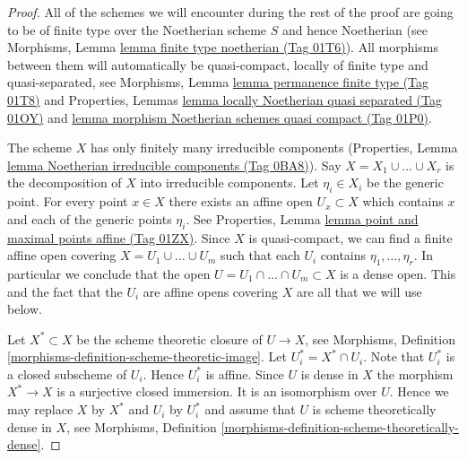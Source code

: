\documentclass{amsart}
\theoremstyle{plain}
\theoremstyle{definition}
\theoremstyle{remark}
\numberwithin{equation}{subsection}
\begin{document}
\begin{proof}
All of the schemes we will encounter during the rest of the proof
are going to be of finite type over the Noetherian scheme $S$ and
hence Noetherian
(see Morphisms, Lemma \href{https://stacks.math.columbia.edu/tag/01T6}{lemma finite type noetherian (Tag 01T6)}).
All morphisms between them will automatically be quasi-compact, locally of
finite type and quasi-separated, see
Morphisms, Lemma \href{https://stacks.math.columbia.edu/tag/01T8}{lemma permanence finite type (Tag 01T8)} and
Properties,
Lemmas \href{https://stacks.math.columbia.edu/tag/01OY}{lemma locally Noetherian quasi separated (Tag 01OY)} and
\href{https://stacks.math.columbia.edu/tag/01P0}{lemma morphism Noetherian schemes quasi compact (Tag 01P0)}.

\medskip\noindent
The scheme $X$ has only finitely many irreducible components
(Properties, Lemma \href{https://stacks.math.columbia.edu/tag/0BA8}{lemma Noetherian irreducible components (Tag 0BA8)}).
Say $X = X_1 \cup \ldots \cup X_r$ is the decomposition
of $X$ into irreducible components.
Let $\eta_i \in X_i$ be the generic point.
For every point $x \in X$ there exists an affine open
$U_x \subset X$ which contains $x$ and each of the generic
points $\eta_i$. See
Properties, Lemma \href{https://stacks.math.columbia.edu/tag/01ZX}{lemma point and maximal points affine (Tag 01ZX)}.
Since $X$ is quasi-compact, we can find a finite affine open
covering $X = U_1 \cup \ldots \cup U_m$ such that
each $U_i$ contains $\eta_1, \ldots, \eta_r$.
In particular we conclude that the open
$U = U_1 \cap \ldots \cap U_m \subset X$ is
a dense open. This and the fact that the $U_i$ are affine opens
covering $X$ are all that we will use below.

\medskip\noindent
Let $X^* \subset X$ be the scheme theoretic closure of $U \to X$, see
Morphisms, Definition \ref{morphisms-definition-scheme-theoretic-image}.
Let $U_i^* = X^* \cap U_i$. Note that $U_i^*$ is a closed subscheme
of $U_i$. Hence $U_i^*$ is affine. Since $U$ is dense in $X$ the
morphism $X^* \to X$ is a surjective closed immersion. It is an
isomorphism over $U$. Hence we may replace $X$ by $X^*$ and
$U_i$ by $U_i^*$ and assume that $U$ is scheme theoretically dense
in $X$, see
Morphisms, Definition \ref{morphisms-definition-scheme-theoretically-dense}.


\end{proof}
\end{document}
